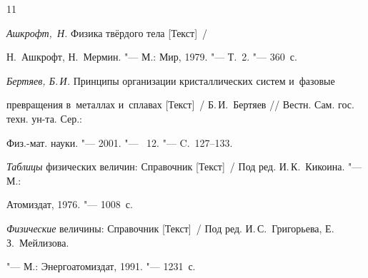 \begin{thebibliography}{11}

\item  \textit{Ашкрофт,~Н.} Физика твёрдого тела [Текст]~/ 

 Н.~Ашкрофт, Н.~Мермин. "--- М.: Мир, 1979. "--- Т.~2. "--- 360~с.



\item  \textit{Бертяев, Б.\,И.} Принципы организации кристаллических систем и~фазовые 

превращения в~металлах и~сплавах [Текст]~/  Б.\,И.~Бертяев /\!/ Вестн. Сам. гос. техн. ун-та. Сер.: 

Физ.-мат. науки. "--- 2001. "--- \No~12. "--- C.~127--133.



\item  \textit{Таблицы} физических величин: Справочник [Текст]~/ Под ред. И.\,К.~Кикоина. "--- М.: 

Атомиздат, 1976. "--- 1008~с.



\item  \textit{Физические} величины: Справочник [Текст]~/ Под ред. И.\,С.~Григорьева, Е.\,З.~Мейлизова. 

"--- М.: Энергоатомиздат, 1991. "---  1231~с.

 

\end{thebibliography}



\vspace{-1cm}



\makeengtitle





%

